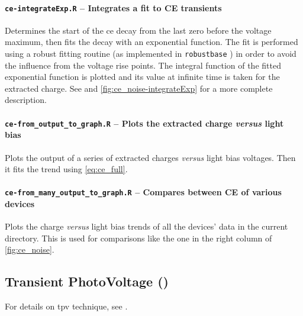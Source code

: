		\paragraph{\texttt{ce-\-integrateExp.R} -- Integrates a fit to CE transients}
		Determines the start of the \gls{ce} decay from the last zero before the voltage maximum, then fits the decay with an exponential function.
		The fit is performed using a robust fitting routine (as implemented in \texttt{robust\-base} \cite{Maechler2018}) in order to avoid the influence from the voltage rise points.
		The integral function of the fitted exponential function is plotted and its value at infinite time is taken for the extracted charge.
				See  and \cref{fig:ce_noise-integrateExp} for a more complete description.
				
		\paragraph{\texttt{ce-\-from\_output\_to\_graph.R} -- Plots the extracted charge \textsl{versus} light bias}
		Plots the output of a series of extracted charges \textsl{versus} light bias voltages.
		Then it fits the trend using \cref{eq:ce_full}.
		
		\paragraph{\texttt{ce-\-from\_many\_output\_to\_graph.R} -- Compares between CE of various devices}
		Plots the charge \textsl{versus} light bias trends of all the devices' data in the current directory.
		This is used for comparisons like the one in the right column of \cref{fig:ce_noise}.
		

	\subsection{Transient PhotoVoltage ()}\label{r_tpv}
	For details on \gls{tpv} technique, see .
	

